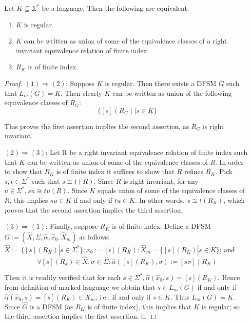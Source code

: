 \begin{theorem}\label{theorem:MyhillNerode}
	Let $K\subseteq\Sigma^\ast$ be a language. Then the following are equivalent:
	\begin{enumerate}[1. ]
		\item $K$ is regular.
		\item $K$ can be written as union of some of the equivalence classes of a right invariant equivalence relation of finite index.
		\item $R_K$ is of finite index.
	\end{enumerate}
\end{theorem}

\begin{proof}
	$(1)\Rightarrow (2)$: Suppose $K$ is regular. Then there exists a DFSM $G$ such that $L_m(G) = K$. Then clearly $K$ can be written as union of the following equivalence classes of $R_G$:
	\[\{[s](R_G)|s\in K \}\]
	
	This proves the first assertion implies the second assertion, as $R_G$ is right invariant.
	
	$(2)\Rightarrow (3)$: Let R be a right invariant equivalence relation of finite index such that $K$ can be written as union of some of the equivalence classes of $R$. In order to show that $R_K$ is of finite index it suffices to show that $R$ refines $R_K$. Pick $s,t\in\Sigma^\ast$  such that $s\cong t(R)$. Since $R$ is right invariant, for any $u\in\Sigma^\ast,su\cong tu(R)$. Since $K$ equals union of some of the equivalence classes of $R$, this implies $su\in K$ if and only if $tu\in K$. In other words, $s\cong t(R_K)$, which proves that the second assertion implies the third assertion.
	
	$(3)\Rightarrow (1)$: Finally, suppose $R_K$ is of finite index. Define a DFSM $G:=(\hat{X},\Sigma,\hat{\alpha},\hat{x}_0,\hat{X}_m)$ as follows: $\hat{X}:=\{[s](R_K)|s\in\Sigma^\ast\}; x_0 :=[\epsilon](R_K); \hat{X}_m=\{[s](R_K)|s\in K \}$;
	and
	\[ \forall [s](R_k)\in\hat{X},\sigma\in\Sigma:\hat{\alpha}([s](R_K),\sigma):=[s\sigma](R_K) \]
	
	Then it is readily verified that for each $s\in\Sigma^\ast,\hat{\alpha}(\hat{x}_0,s)=[s](R_K)$. Hence
	from definition of marked language we obtain that $s\in L_m(G)$ if and only if $\hat{\alpha}(\hat{x}_0,s) = [s](R_K) \in X_m$, i.e., if and only if $s\in K$. Thus $L_m(G) = K$. Since $\hat{G}$ is a DFSM (as $R_K$ is of finite index), this implies that $K$ is regular; so the third assertion implies the first assertion. $\hfill\square$
\end{proof}

